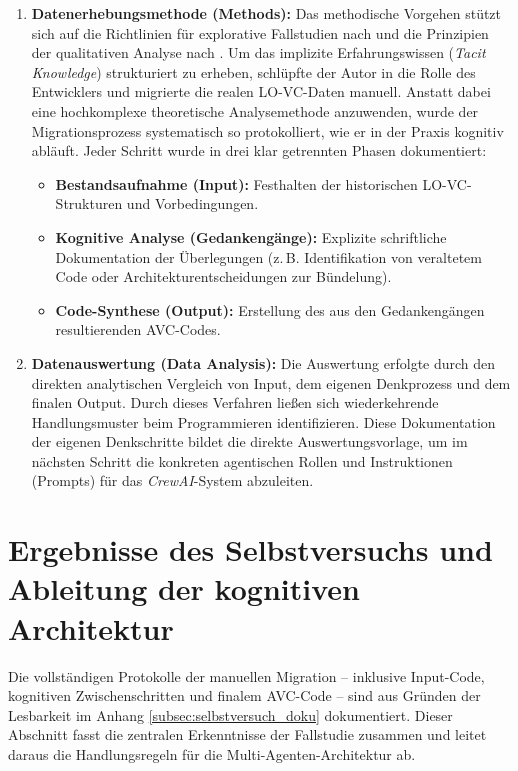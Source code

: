 \begin{enumerate}
    \item \textbf{Datenerhebungsmethode (Methods):} 
    Das methodische Vorgehen stützt sich auf die Richtlinien für explorative Fallstudien nach \textcite{runesonGuidelinesConductingReporting2009} und die Prinzipien der qualitativen Analyse nach \textcite{seamanQualitativeMethodsEmpirical1999}. Um das implizite Erfahrungswissen (\textit{Tacit Knowledge}) strukturiert zu erheben, schlüpfte der Autor in die Rolle des Entwicklers und migrierte die realen \ac{LO-VC}-Daten manuell. Anstatt dabei eine hochkomplexe theoretische Analysemethode anzuwenden, wurde der Migrationsprozess systematisch so protokolliert, wie er in der Praxis kognitiv abläuft. Jeder Schritt wurde in drei klar getrennten Phasen dokumentiert:
    \begin{itemize}
        \item \textbf{Bestandsaufnahme (Input):} Festhalten der historischen \ac{LO-VC}-Strukturen und Vorbedingungen.
        \item \textbf{Kognitive Analyse (Gedankengänge):} Explizite schriftliche Dokumentation der Überlegungen (z.\,B. Identifikation von veraltetem Code oder Architekturentscheidungen zur Bündelung).
        \item \textbf{Code-Synthese (Output):} Erstellung des aus den Gedankengängen resultierenden \ac{AVC}-Codes.
    \end{itemize}

    \item \textbf{Datenauswertung (Data Analysis):} 
    Die Auswertung erfolgte durch den direkten analytischen Vergleich von Input, dem eigenen Denkprozess und dem finalen Output. Durch dieses Verfahren ließen sich wiederkehrende Handlungsmuster beim Programmieren identifizieren. Diese Dokumentation der eigenen Denkschritte bildet die direkte Auswertungsvorlage, um im nächsten Schritt die konkreten agentischen Rollen und Instruktionen (Prompts) für das \textit{CrewAI}-System abzuleiten.
\end{enumerate}
\section{Ergebnisse des Selbstversuchs und Ableitung der kognitiven Architektur}
\label{sec:ergebnisse_selbstversuch}

Die vollständigen Protokolle der manuellen Migration – inklusive Input-Code, kognitiven Zwischenschritten und finalem \ac{AVC}-Code – sind aus Gründen der Lesbarkeit im Anhang \ref{subsec:selbstversuch_doku} dokumentiert. Dieser Abschnitt fasst die zentralen Erkenntnisse der Fallstudie zusammen und leitet daraus die Handlungsregeln für die Multi-Agenten-Architektur ab.

